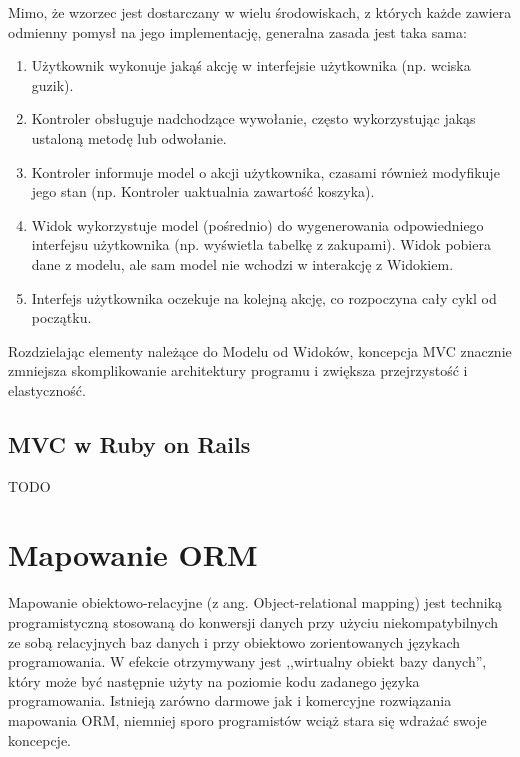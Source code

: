 \documentclass[a4paper,12pt,oneside]{report}
\begin{document}
Mimo, że wzorzec jest dostarczany w wielu środowiskach, z których każde zawiera odmienny pomysł na jego implementację, generalna zasada jest taka sama:
\begin{enumerate}
  \item Użytkownik wykonuje jakąś akcję w interfejsie użytkownika (np. wciska guzik).
  \item Kontroler obsługuje nadchodzące wywołanie, często wykorzystując jakąs ustaloną metodę lub odwołanie.
  \item Kontroler informuje model o akcji użytkownika, czasami również modyfikuje jego stan (np. Kontroler uaktualnia zawartość koszyka).
  \item Widok wykorzystuje model (pośrednio) do wygenerowania odpowiedniego interfejsu użytkownika (np. wyświetla tabelkę z zakupami). Widok pobiera dane z modelu, ale sam model nie wchodzi w interakcję z Widokiem.
  \item Interfejs użytkownika oczekuje na kolejną akcję, co rozpoczyna cały cykl od początku.
\end{enumerate}

Rozdzielając elementy należące do Modelu od Widoków, koncepcja MVC znacznie zmniejsza skomplikowanie architektury programu i zwiększa przejrzystość i elastyczność.

\subsection{MVC w Ruby on Rails}
\label{subsec:mvc-ror}
TODO

\section{Mapowanie ORM}
\label{sec:orm}
Mapowanie obiektowo-relacyjne (z ang. Object-relational mapping) jest techniką programistyczną stosowaną do konwersji danych przy użyciu niekompatybilnych ze sobą relacyjnych baz danych i przy obiektowo zorientowanych językach programowania. W efekcie otrzymywany jest ,,wirtualny obiekt bazy danych'', który może być następnie użyty na poziomie kodu zadanego języka programowania. Istnieją zarówno darmowe jak i komercyjne rozwiązania mapowania ORM, niemniej sporo programistów wciąż stara się wdrażać swoje koncepcje.
\end{document}
